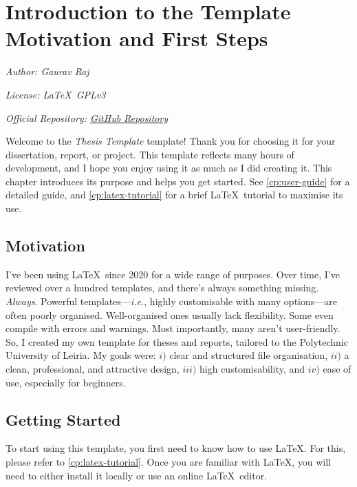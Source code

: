 \chapter[Introduction to the Template: Motivation and First Steps]{Introduction to the Template Motivation and First Steps}
\label{cp:introduction}

{
	\parindent0pt

	\textit{Author: Gaurav Raj}

	\textit{License: \LaTeX~GPLv3}

	\textit{Official Repository: \href{https://github.com/thehackersbrain/thesis-template}{GitHub Repository}}

	\vspace{.935em}

	Welcome to the \textcolor{maincolor}{\textit{Thesis Template}} template! Thank you for choosing it for your dissertation, report, or project. This template reflects many hours of development, and I hope you enjoy using it as much as I did creating it. This chapter introduces its purpose and helps you get started. See \autoref{cp:user-guide} for a detailed guide, and \autoref{cp:latex-tutorial} for a brief \LaTeX~tutorial to maximise its use.
}

\section{Motivation}
I've been using \LaTeX~since 2020 for a wide range of purposes. Over time, I've reviewed over a hundred templates, and there's always something missing. \textit{Always}. Powerful templates---\textit{i.e.}, highly customisable with many options---are often poorly organised. Well-organised ones usually lack flexibility. Some even compile with errors and warnings. Most importantly, many aren't user-friendly. So, I created my own template for theses and reports, tailored to the Polytechnic University of Leiria. My goals were: \(i)\) clear and structured file organisation, \(ii)\) a clean, professional, and attractive design, \(iii)\) high customisability, and \(iv)\) ease of use, especially for beginners.


\section{Getting Started}
To start using this template, you first need to know how to use \LaTeX. For this, please refer to \autoref{cp:latex-tutorial}. Once you are familiar with \LaTeX, you will need to either install it locally or use an online \LaTeX~editor.

